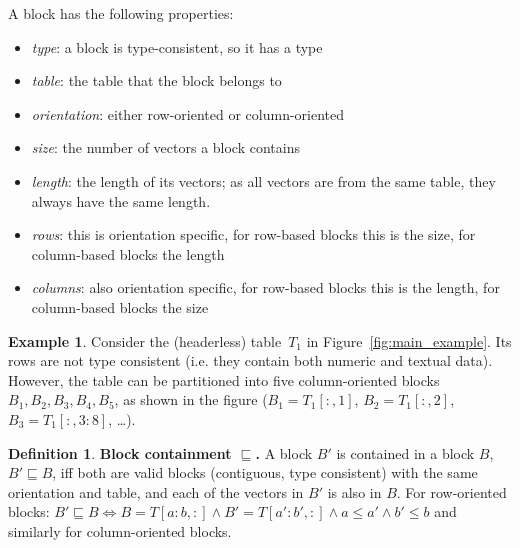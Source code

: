 \documentclass{IEEEtran}
\newcommand{\range}[3]{\ensuremath{#1[#2,#3]}}
\newcommand{\rangeto}[2]{#1{:}#2}
\newcommand{\rangeall}{:}
\theoremstyle{definition}
\newtheorem{definition}{Definition}
\newtheorem{example}{Example}
\begin{document}
A block has the following properties:
\begin{itemize}
\item \textit{type}: a block is type-consistent, so it has a type
\item \textit{table}: the table that the block belongs to
\item \textit{orientation}: either row-oriented or column-oriented
\item \textit{size}: the number of vectors a block contains
\item \textit{length}: the length of its vectors; as all vectors are from the same table, they always have the same length.
\item \textit{rows}: this is orientation specific, for row-based blocks this is the size, for column-based blocks the length
\item \textit{columns}: also orientation specific, for row-based blocks this is the length, for column-based blocks the size
\end{itemize}



\begin{example}
Consider the (headerless) table~$T_1$ in Figure~\ref{fig:main_example}.
Its rows are not type consistent (i.e. they contain both numeric and textual data).
However, the table can be partitioned into five column-oriented blocks $B_1, B_2, B_3, B_4, B_5$, as shown in the figure ($B_1 = \range{T_1}{\rangeall}{1}$, $B_2 = \range{T_1}{\rangeall}{2}$, $B_3 = \range{T_1}{\rangeall}{\rangeto{3}{8}}$, \dots).
\end{example}

\begin{definition}
\textbf{Block containment $\sqsubseteq$.} 
A block $B'$ is contained in a block $B$, $B' \sqsubseteq B$, iff both are valid blocks (contiguous, type consistent) with the same orientation and table, and each of the vectors in $B'$ is also in $B$. For row-oriented blocks: $B' \sqsubseteq B \Leftrightarrow B=\range{T}{\rangeto{a}{b}}{\rangeall} \wedge B'=\range{T}{\rangeto{a'}{b'}}{\rangeall} \wedge a \leq a' \wedge b' \leq b$ and similarly for column-oriented blocks.
\end{definition}
\end{document}
